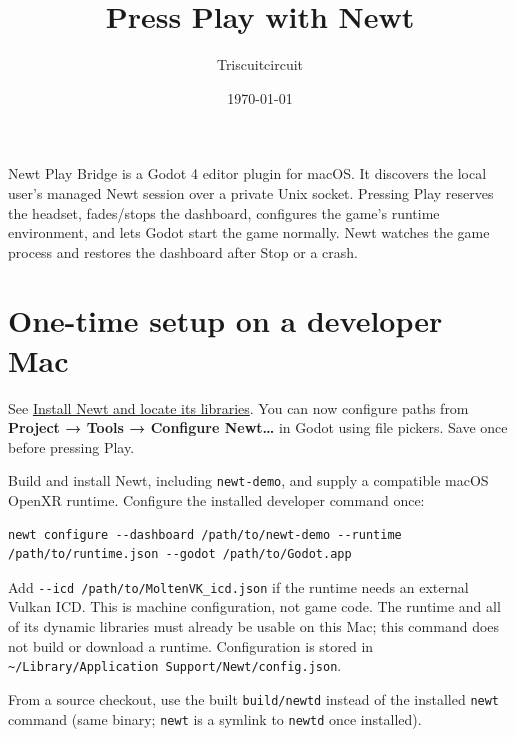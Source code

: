 \documentclass[11pt]{article}
\author{Triscuitcircuit}
\date{\today}
\title{Press Play with Newt}
\begin{document}
\maketitle
\tableofcontents

\clearpage

Newt Play Bridge is a Godot 4 editor plugin for macOS. It discovers the local user's managed Newt session over a private Unix socket. Pressing Play reserves the headset, fades/stops the dashboard, configures the game's runtime environment, and lets Godot start the game normally. Newt watches the game process and restores the dashboard after Stop or a crash.
\section{One-time setup on a developer Mac}
\label{sec:org163039b}
See \href{INSTALL.md}{Install Newt and locate its libraries}. You can now configure paths from \textbf{Project → Tools → Configure Newt…} in Godot using file pickers. Save once before pressing Play.

Build and install Newt, including \texttt{newt-demo}, and supply a compatible macOS OpenXR runtime. Configure the installed developer command once:
\begin{verbatim}
newt configure --dashboard /path/to/newt-demo --runtime /path/to/runtime.json --godot /path/to/Godot.app
\end{verbatim}
Add \texttt{-{}-{}icd /path/to/MoltenVK\_icd.json} if the runtime needs an external Vulkan ICD. This is machine configuration, not game code. The runtime and all of its dynamic libraries must already be usable on this Mac; this command does not build or download a runtime. Configuration is stored in \texttt{\textasciitilde{}/Library/Application Support/Newt/config.json}.

From a source checkout, use the built \texttt{build/newtd} instead of the installed \texttt{newt} command (same binary; \texttt{newt} is a symlink to \texttt{newtd} once installed).
\end{document}
